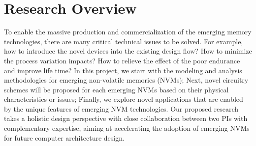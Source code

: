 \section{Research Overview}
To enable the massive production and commercialization of the emerging memory technologies, there are many critical technical issues to be solved. For example, how to introduce the novel devices into the existing design flow? How to minimize the process variation impacts? How to relieve the effect of the poor endurance and improve life time? In this project, we start with the modeling and analysis methodologies for emerging non-volatile memories (NVMs); Next, novel circuitry schemes will be proposed for each emerging NVMs based on their physical characteristics or issues; Finally, we explore novel applications that are enabled by the unique  features of emerging NVM technologies. Our proposed research takes a holistic design perspective with close collaboration between two PIs with complementary expertise, aiming at accelerating the adoption of emerging NVMs for future computer architecture design.





